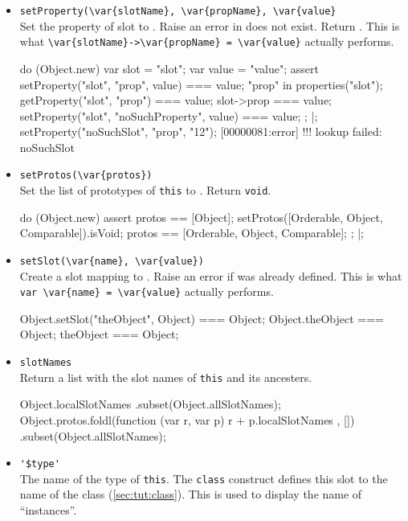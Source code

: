 \begin{itemize}
\item \lstinline|setProperty(\var{slotName}, \var{propName}, \var{value}|\\
  Set the property  of slot  to
  .  Raise an error in  does not exist.
  Return .  This is what
  \lstinline|\var{slotName}->\var{propName} = \var{value}| actually
  performs.
\begin{urbiscript}
do (Object.new)
{
  var slot = "slot";
  var value = "value";
  assert
  {
    setProperty("slot", "prop", value) === value;
    "prop" in properties("slot");
    getProperty("slot", "prop") === value;
    slot->prop === value;
    setProperty("slot", "noSuchProperty", value) === value;
 };
}|;
setProperty("noSuchSlot", "prop", "12");
[00000081:error] !!! lookup failed: noSuchSlot
\end{urbiscript}


\item \lstinline|setProtos(\var{protos})|\\
  Set the list of prototypes of \lstinline|this| to .
  Return \lstinline|void|.
\begin{urbiscript}
do (Object.new)
{
  assert
  {
    protos == [Object];
    setProtos([Orderable, Object, Comparable]).isVoid;
    protos == [Orderable, Object, Comparable];
  };
}|;
\end{urbiscript}

\item \lstinline|setSlot(\var{name}, \var{value})|\\
  Create a slot  mapping to . Raise an error if
   was already defined.  This is what
  \lstinline|var \var{name} = \var{value}| actually performs.
\begin{urbiassert}
Object.setSlot("theObject", Object) === Object;
Object.theObject === Object;
theObject === Object;
\end{urbiassert}

\item \lstinline|slotNames|\\
  Return a list with the slot names of \lstinline|this| and its
  ancesters.
\begin{urbiassert}
Object.localSlotNames
  .subset(Object.allSlotNames);
Object.protos.foldl(function (var r, var p) { r + p.localSlotNames },
                    [])
  .subset(Object.allSlotNames);
\end{urbiassert}

\item \lstinline|'$type'|\\ %
  The name of the type of \lstinline|this|.  The \lstinline|class|
  construct defines this slot to the name of the class
  (\autoref{sec:tut:class}).  This is used to display the name of
  ``instances''.


\end{itemize}
